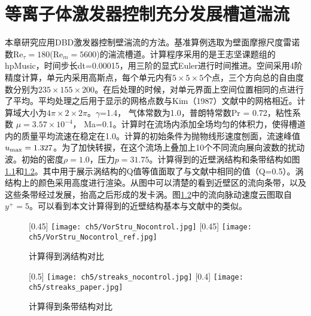 \chapter{等离子体激发器控制充分发展槽道湍流}
本章研究应用DBD激发器控制壁湍流的方法。基准算例选取为壁面摩擦尺度雷诺数Re$_\tau=180$(Re$_m=5600$)的湍流槽道。计算程序采用的是王志坚课题组的hpMusic\cite{WangZJ2009,Zhu2016,Zh2017}，时间步长dt=0.00015，用三阶的显式Euler进行时间推进。空间采用4阶精度计算，单元内采用高斯点，每个单元内有$5\times5\times5$个点，三个方向总的自由度数分别为$235\times155\times200$。在后处理的时候，对单元界面上空间位置相同的点进行了平均。平均处理之后用于显示的网格点数与Kim（1987）\cite{Kim1987}文献中的网格相近。计算域大小为$4\pi \times 2\times 2\pi$。$\gamma$=1.4， 气体常数为1.0，普朗特常数Pr = 0.72，粘性系数 $\mu=3.57\times10^{-4}$， Ma=0.1。计算时在流场内添加全场均匀的体积力，使得槽道内的质量平均流速在稳定在1.0。计算的初始条件为抛物线形速度刨面，流速峰值$u_{\rm max} = 1.327$。为了加快转捩，在这个流场上叠加上10个不同流向展向波数的扰动波。初始的密度$\rho=1.0$，压力$p= 31.75$。计算得到的近壁涡结构和条带结构如图\ref{f:nearwallvortex}和\ref{f:nearwallstreak}。其中用于展示涡结构的Q值等值面取了与文献中相同的值（Q=0.5）。涡结构上的颜色采用高度进行渲染。从图中可以清楚的看到近壁区的流向条带，以及这些条带经过发展，抬高之后形成的发卡涡。图\ref{f:nearwallstreak}中的流向脉动速度云图取自$y^+=5$。可以看到本文计算得到的近壁结构基本与文献中的类似。
\begin{figure}[htb]
  \centering
  [0.45\textwidth] %
    {\texttt{[image: ch5/VorStru\_Nocontrol.jpg]}}%
  [0.45\textwidth]
    {\texttt{[image: ch5/VorStru\_Nocontrol\_ref.jpg]}}%
  \caption{计算得到涡结构对比}\label{f:nearwallvortex}
\end{figure}
\begin{figure}[htb]
  \centering
  [0.5\textwidth] %
    {\texttt{[image: ch5/streaks\_nocontrol.jpg]}}%
  [0.4\textwidth]
    {\texttt{[image: ch5/streaks\_paper.jpg]}}%
  \caption{计算得到条带结构对比}\label{f:nearwallstreak}
\end{figure}

